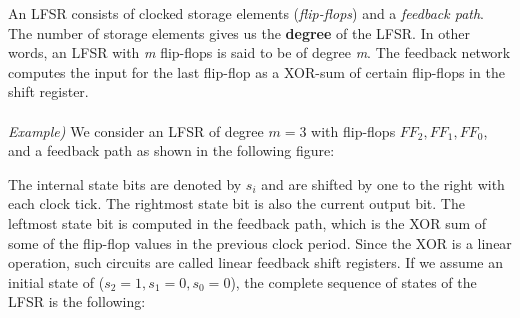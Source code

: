 An LFSR consists of clocked storage elements (\textit{flip-flops}) and a \textit{feedback path}. The number of storage elements gives us the \textbf{degree} of the LFSR. In other words, an LFSR with \textit{m} flip-flops is said to be of degree \textit{m}. The feedback network computes the input for the last flip-flop as a XOR-sum of certain flip-flops in the shift register.\\\\
\textit{Example)} We consider an LFSR of degree $m=3$ with flip-flops $FF_2,FF_1,FF_0$, and a feedback path as shown in the following figure:
\begin{center}
\end{center}
The internal state bits are denoted by $s_i$ and are shifted by one to the right with each clock tick. The rightmost state bit is also the current output bit. The leftmost state bit is computed in the feedback path, which is the XOR sum of some of the flip-flop values in the previous clock period. Since the XOR is a linear operation, such circuits are called linear feedback shift registers. If we assume an initial state of ($s_2=1, s_1=0, s_0=0$), the complete sequence of states of the LFSR is the following:

